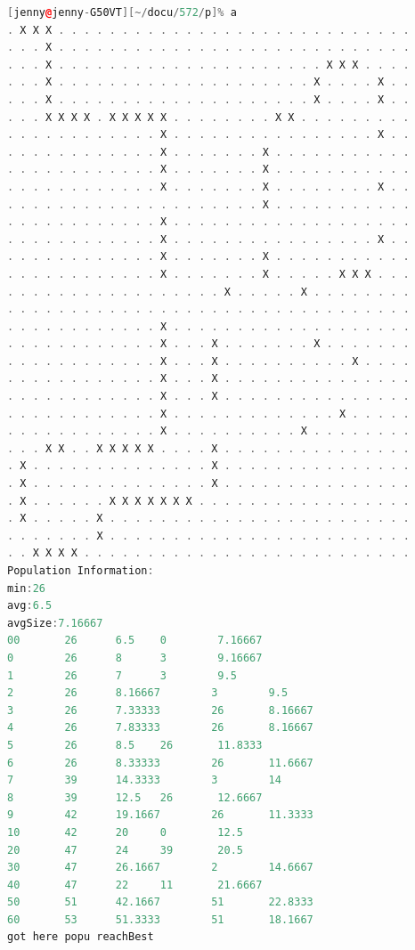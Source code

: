 \documentclass[10pt,b5paper]{article}
\begin{document}
\begin{lstlisting}[language=c++]
[jenny@jenny-G50VT][~/docu/572/p]% a
. X X X . . . . . . . . . . . . . . . . . . . . . . . . . . . . 
. . . X . . . . . . . . . . . . . . . . . . . . . . . . . . . . 
. . . X . . . . . . . . . . . . . . . . . . . . . X X X . . . . 
. . . X . . . . . . . . . . . . . . . . . . . . X . . . . X . . 
. . . X . . . . . . . . . . . . . . . . . . . . X . . . . X . . 
. . . X X X X . X X X X X . . . . . . . . X X . . . . . . . . . 
. . . . . . . . . . . . X . . . . . . . . . . . . . . . . X . . 
. . . . . . . . . . . . X . . . . . . . X . . . . . . . . . . . 
. . . . . . . . . . . . X . . . . . . . X . . . . . . . . . . . 
. . . . . . . . . . . . X . . . . . . . X . . . . . . . . X . . 
. . . . . . . . . . . . . . . . . . . . X . . . . . . . . . . . 
. . . . . . . . . . . . X . . . . . . . . . . . . . . . . . . . 
. . . . . . . . . . . . X . . . . . . . . . . . . . . . . X . . 
. . . . . . . . . . . . X . . . . . . . X . . . . . . . . . . . 
. . . . . . . . . . . . X . . . . . . . X . . . . . X X X . . . 
. . . . . . . . . . . . . . . . . X . . . . . X . . . . . . . . 
. . . . . . . . . . . . . . . . . . . . . . . . . . . . . . . . 
. . . . . . . . . . . . X . . . . . . . . . . . . . . . . . . . 
. . . . . . . . . . . . X . . . X . . . . . . . X . . . . . . . 
. . . . . . . . . . . . X . . . X . . . . . . . . . . X . . . . 
. . . . . . . . . . . . X . . . X . . . . . . . . . . . . . . . 
. . . . . . . . . . . . X . . . X . . . . . . . . . . . . . . . 
. . . . . . . . . . . . X . . . . . . . . . . . . . X . . . . . 
. . . . . . . . . . . . X . . . . . . . . . . X . . . . . . . . 
. . . X X . . X X X X X . . . . X . . . . . . . . . . . . . . . 
. X . . . . . . . . . . . . . . X . . . . . . . . . . . . . . . 
. X . . . . . . . . . . . . . . X . . . . . . . . . . . . . . . 
. X . . . . . . X X X X X X X . . . . . . . . . . . . . . . . . 
. X . . . . . X . . . . . . . . . . . . . . . . . . . . . . . . 
. . . . . . . X . . . . . . . . . . . . . . . . . . . . . . . . 
. . X X X X . . . . . . . . . . . . . . . . . . . . . . . . . . 
Population Information: 
min:26
avg:6.5
avgSize:7.16667
00       26      6.5    0        7.16667
0        26      8      3        9.16667
1        26      7      3        9.5
2        26      8.16667        3        9.5
3        26      7.33333        26       8.16667
4        26      7.83333        26       8.16667
5        26      8.5    26       11.8333
6        26      8.33333        26       11.6667
7        39      14.3333        3        14
8        39      12.5   26       12.6667
9        42      19.1667        26       11.3333
10       42      20     0        12.5
20       47      24     39       20.5
30       47      26.1667        2        14.6667
40       47      22     11       21.6667
50       51      42.1667        51       22.8333
60       53      51.3333        51       18.1667
got here popu reachBest
\end{lstlisting}
\end{document}
